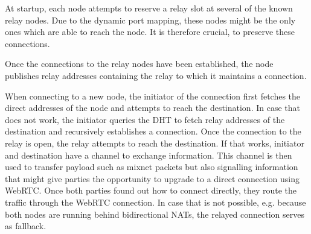 At startup, each node attempts to reserve a relay slot at several of the known relay nodes. Due to the dynamic port mapping, these nodes might be the only ones which are able to reach the node. It is therefore crucial, to preserve these connections.

Once the connections to the relay nodes have been established, the node publishes relay addresses containing the relay to which it maintains a connection.

When connecting to a new node, the initiator of the connection first fetches the direct addresses of the node and attempts to reach the destination. In case that does not work, the initiator queries the DHT to fetch relay addresses of the destination and recursively establishes a connection. Once the connection to the relay is open, the relay attempts to reach the destination. If that works, initiator and destination have a channel to exchange information. This channel is then used to transfer payload such as mixnet packets but also signalling information that might give parties the opportunity to upgrade to a direct connection using WebRTC. Once both parties found out how to connect directly, they route the traffic through the WebRTC connection. In case that is not possible, e.g. because both nodes are running behind bidirectional NATs, the relayed connection serves as fallback.

